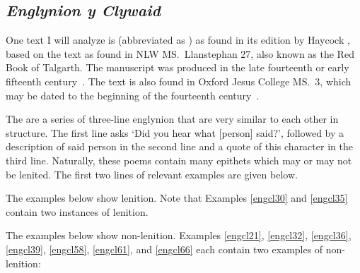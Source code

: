 \subsection{\textit{Englynion y Clywaid}}
One text I will analyze is  (abbreviated as ) as found in its edition by Haycock \autocite*[313--337]{haycock_blodeugerdd_1994}, based on the text as found in NLW MS.\ Llanstephan 27, also known as the Red Book of Talgarth. The manuscript was produced in the late fourteenth or early fifteenth century~\autocite[60]{huws_medieval_2000}. The text is also found in Oxford Jesus College MS.\ 3, which may be dated to the beginning of the fourteenth century~\autocite[297]{haycock_blodeugerdd_1994}.

The  are a series of three-line englynion that are very similar to each other in structure. The first line asks `Did you hear what [person] said?', followed by a description of said person in the second line and a quote of this character in the third line. Naturally, these poems contain many epithets which may or may not be lenited. The first two lines of relevant examples are given below. 

The examples below show lenition. Note that Examples \ref{engcl30} and \ref{engcl35} contain two instances of lenition.
\begin{mwl}
\end{mwl}

The examples below show non-lenition. Examples \ref{engcl21},
\ref{engcl32},
\ref{engcl36},
\ref{engcl39},
\ref{engcl58},
\ref{engcl61}, and
\ref{engcl66} each contain two examples of non-lenition:

